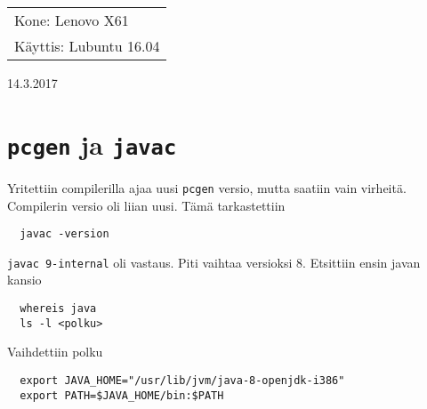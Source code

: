 \documentclass[main.tex]{subfiles}
\begin{document}
\thispagestyle{empty}
\begin{tabular}[t]{l}
Kone: Lenovo X61\\
Käyttis: Lubuntu 16.04
\end{tabular}
\hfill 14.3.2017

\section{\texttt{pcgen} ja \texttt{javac}}

Yritettiin compilerilla ajaa uusi \texttt{pcgen} versio, mutta saatiin vain virheitä. Compilerin versio oli liian uusi. Tämä tarkastettiin

\begin{lstlisting}
  javac -version
\end{lstlisting}

\texttt{javac 9-internal} oli vastaus. Piti vaihtaa versioksi 8. Etsittiin ensin javan kansio

\begin{lstlisting}
  whereis java
  ls -l <polku>
\end{lstlisting}

Vaihdettiin polku

\begin{lstlisting}
  export JAVA_HOME="/usr/lib/jvm/java-8-openjdk-i386"
  export PATH=$JAVA_HOME/bin:$PATH
\end{lstlisting}
\end{document}
